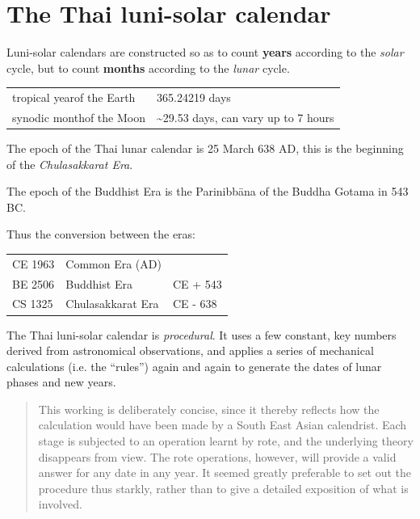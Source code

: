 \documentclass[11pt,oneside]{memoir-article}
\begin{document}
\clearpage

\chapter{The Thai luni-solar calendar}
\label{sec-3}

Luni-solar calendars are constructed so as to count \textbf{years} according to the
\emph{solar} cycle, but to count \textbf{months} according to the \emph{lunar} cycle.

\begin{center}
\begin{tabular}{ll}
tropical year\footnotemark\space of the Earth & 365.24219 days\\
synodic month\footnotemark\space of the Moon & \textasciitilde{}29.53 days, can vary up to 7 hours\\
\end{tabular}
\end{center}

The epoch of the Thai lunar calendar is 25 March 638 AD, this is the beginning
of the \emph{Chulasakkarat Era}\cite{TODO}.


The epoch of the Buddhist Era is the Parinibbāna of the Buddha Gotama in 543 BC.

Thus the conversion between the eras:

\begin{center}
\begin{tabular}{lll}
CE 1963 & Common Era (AD) & \\
BE 2506 & Buddhist Era & CE + 543\\
CS 1325 & Chulasakkarat Era & CE - 638\\
\end{tabular}
\end{center}

The Thai luni-solar calendar is \emph{procedural}. It uses a few constant,
key numbers derived from astronomical observations, and applies a
series of mechanical calculations (i.e. the ``rules'') again and again
to generate the dates of lunar phases and new years.

\begin{quote}
This working is deliberately concise, since it thereby reflects how
the calculation would have been made by a South East Asian calendrist.
Each stage is subjected to an operation learnt by rote, and the
underlying theory disappears from view. The rote operations, however,
will provide a valid answer for any date in any year. It seemed
greatly preferable to set out the procedure thus starkly, rather than
to give a detailed exposition of what is involved.\cite{eade-interpolation}
\end{quote}
\end{document}
